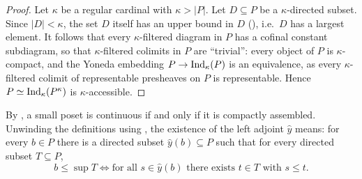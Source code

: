 	\begin{proof}
		Let $\kappa$ be a regular cardinal with $\kappa > |P|$. Let $D \subseteq P$ be a $\kappa$-directed subset. Since $|D| < \kappa$, the set $D$ itself has an upper bound in $D$ (), i.e.\ $D$ has a largest element. It follows that every $\kappa$-filtered diagram in $P$ has a cofinal constant subdiagram, so that $\kappa$-filtered colimits in $P$ are ``trivial'': every object of $P$ is $\kappa$-compact, and the Yoneda embedding $P \to \operatorname{Ind}_{\kappa}(P)$ is an equivalence, as every $\kappa$-filtered colimit of representable presheaves on $P$ is representable. Hence $P \simeq \operatorname{Ind}_{\kappa}(P^{\kappa})$ is $\kappa$-accessible.
	\end{proof}


	By , a small poset is continuous if and only if it is compactly assembled. Unwinding the definitions using , the existence of the left adjoint $\hat{y}$ means: for every $b \in P$ there is a directed subset $\hat{y}(b) \subseteq P$ such that for every directed subset $T \subseteq P$,
	\begin{equation}
		\label{eq:Yhat_Poset}
		b \leq \sup T \iff \text{for all } s \in \hat{y}(b) \text{ there exists } t \in T \text{ with } s \leq t.
	\end{equation}


